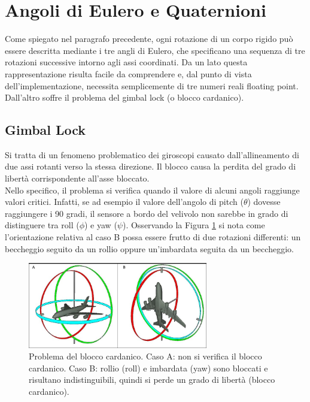 
\section{Angoli di Eulero e Quaternioni}
Come spiegato nel paragrafo precedente, ogni rotazione di un corpo rigido può essere descritta mediante i tre angli di Eulero, che specificano una sequenza di tre rotazioni successive intorno agli assi coordinati. Da un lato questa rappresentazione risulta facile da comprendere e, dal punto di vista dell'implementazione, necessita semplicemente di tre numeri reali floating point. Dall'altro soffre il problema del gimbal lock (o blocco cardanico).\\

\subsection{Gimbal Lock}
Si tratta di un fenomeno problematico dei giroscopi causato dall'allineamento di due assi rotanti verso la stessa direzione. Il blocco causa la perdita del grado di libertà corrispondente all'asse bloccato.\\

Nello specifico, il problema si verifica quando il valore di alcuni angoli raggiunge valori critici. Infatti, se ad esempio il valore dell'angolo di pitch ($\theta$) dovesse raggiungere i 90 gradi, il sensore a bordo del velivolo non sarebbe in grado di distinguere tra roll ($\phi$) e yaw ($\psi$). Osservando la Figura \ref{fig:gimbal_lock} si nota come l'orientazione relativa al caso B possa essere frutto di due rotazioni differenti: un beccheggio seguito da un rollio oppure un'imbardata seguita da un beccheggio.

\begin{figure}[H]
    \centering
    \includegraphics[width=0.7\textwidth]{gfx/gimbal_lock}
    \caption[Problema del blocco cardanico.]{Problema del blocco cardanico. Caso A: non si verifica il blocco cardanico. Caso B: rollio (roll) e imbardata (yaw) sono bloccati e risultano indistinguibili, quindi si perde un grado di libertà (blocco cardanico).}
    \label{fig:gimbal_lock}
\end{figure}

